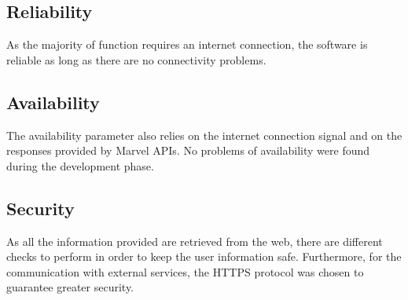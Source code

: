 \subsection{Reliability}
As the majority of function requires an internet connection, the software is reliable as long as there are no connectivity problems.

\subsection{Availability}
The availability parameter also relies on the internet connection signal and on the responses provided by Marvel APIs. No problems of availability were found during the development phase.

\subsection{Security}
As all the information provided are retrieved from the web, there are different checks to perform in order to keep the user information safe. Furthermore, for the communication with external services, the HTTPS protocol was chosen to guarantee greater security.
